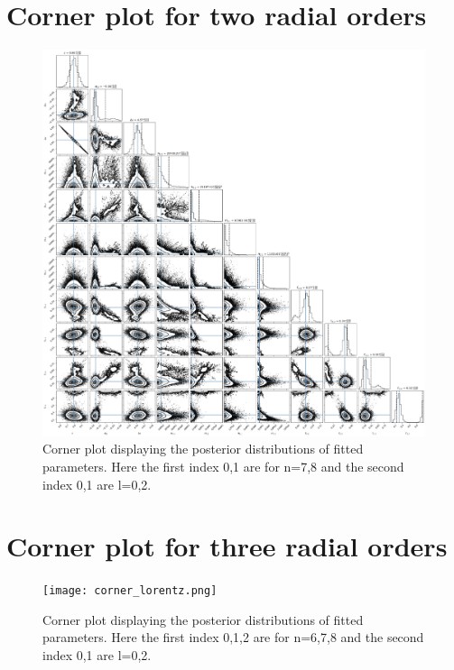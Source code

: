 \documentclass[12pt]{article}
\begin{document}
\section{Corner plot for two radial orders}\label{a:C}
\begin{figure}[H]
  \centering
  \includegraphics[width=\linewidth]{corner_lorentz2.png}
  \caption{Corner plot displaying the posterior distributions of fitted parameters. Here the first index 0,1 are for n=7,8 and the second index 0,1 are l=0,2.}
  \label{fig:corner_lorentz2}
\end{figure}
\newpage 
\section{Corner plot for three radial orders}\label{a:D}
\begin{figure}[H]
  \centering
  \texttt{[image: corner\_lorentz.png]}
  \caption{Corner plot displaying the posterior distributions of fitted parameters. Here the first index 0,1,2 are for n=6,7,8 and the second index 0,1 are l=0,2.}
  \label{fig:corner_lorentz}
\end{figure}
% 
% 
\end{document}
